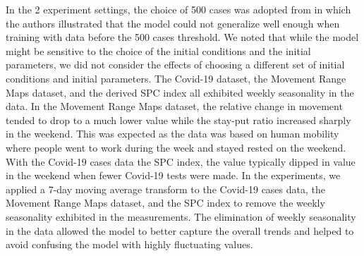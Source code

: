 In the 2 experiment settings, the choice of 500 cases was adopted from \cite{dandekarMachineLearningAidedGlobal2020a} in which the authors illustrated that the model could not generalize well enough when training with data before the 500 cases threshold.
We noted that while the model might be sensitive to the choice of the initial conditions and the initial parameters, we did not consider the effects of choosing a different set of initial conditions and initial parameters.
The Covid-19 dataset, the Movement Range Maps dataset, and the derived \gls{SPC} index all exhibited weekly seasonality in the data.
In the Movement Range Maps dataset, the relative change in movement tended to drop to a much lower value while the stay-put ratio increased sharply in the weekend.
This was expected as the data was based on human mobility where people went to work during the week and stayed rested on the weekend.
With the Covid-19 cases data the \gls{SPC} index, the value typically dipped in value in the weekend when fewer Covid-19 tests were made.
In the experiments, we applied a 7-day moving average transform to the Covid-19 cases data, the Movement Range Maps dataset, and the \gls{SPC} index to remove the weekly seasonality exhibited in the measurements.
The elimination of weekly seasonality in the data allowed the model to better capture the overall trends and helped to avoid confusing the model with highly fluctuating values.